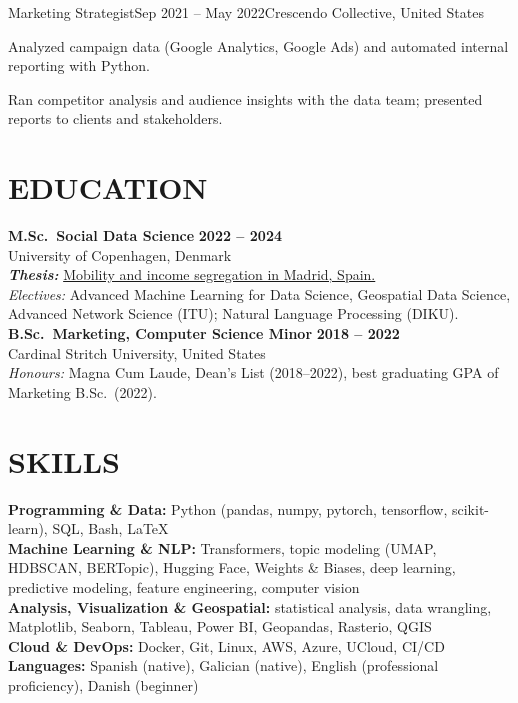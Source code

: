 \documentclass{resume}
\begin{document}
\begin{content}
    \begin{position}{Marketing Strategist}{Sep 2021 -- May 2022}{Crescendo Collective, United States}{}{}
        \item Analyzed campaign data (Google Analytics, Google Ads) and automated internal reporting with Python.
        \item Ran competitor analysis and audience insights with the data team; presented reports to clients and stakeholders.
    \end{position}

\end{content}

\section{EDUCATION}
\begin{content}
    {\bf M.Sc.\ Social Data Science} \hfill {\bf 2022 -- 2024} \\
    University of Copenhagen, Denmark \\
    {\bf \em Thesis:} {\href{https://github.com/carobs9/segregation-madrid}{Mobility and income segregation in Madrid, Spain.}} \\
    {\small {\em Electives:} Advanced Machine Learning for Data Science, Geospatial Data Science, Advanced Network Science (ITU); Natural Language Processing (DIKU).} \\[0.4em]
    {\bf B.Sc.\ Marketing, Computer Science Minor} \hfill {\bf 2018 -- 2022} \\
    Cardinal Stritch University, United States \\
    {\small {\em Honours:} Magna Cum Laude, Dean's List (2018--2022), best graduating GPA of Marketing B.Sc.\ (2022).}
\end{content}

\section{SKILLS}
\begin{content}
    {\bf Programming \& Data:} Python {\footnotesize (pandas, numpy, pytorch, tensorflow, scikit-learn)}, SQL, Bash, \LaTeX \\
    {\bf Machine Learning \& NLP:} Transformers, topic modeling {\footnotesize (UMAP, HDBSCAN, BERTopic)}, Hugging Face, Weights \& Biases, deep learning, predictive modeling, feature engineering, computer vision \\
    {\bf Analysis, Visualization \& Geospatial:} statistical analysis, data wrangling, Matplotlib, Seaborn, Tableau, Power BI, Geopandas, Rasterio, QGIS \\
    {\bf Cloud \& DevOps:} Docker, Git, Linux, AWS, Azure, UCloud, CI/CD \\
    {\bf Languages:} Spanish {\footnotesize (native)}, Galician {\footnotesize (native)}, English {\footnotesize (professional proficiency)}, Danish {\footnotesize (beginner)}
\end{content}
\end{document}
